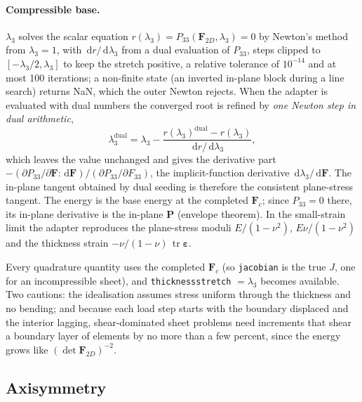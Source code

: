 \documentclass[11pt]{article}
\newcommand{\ud}{\,\mathrm{d}}
\newcommand{\tr}{\operatorname{tr}}
\newcommand{\beps}{\bm{\varepsilon}}
\newcommand{\bP}{\bm{P}}
\newcommand{\bF}{\bm{F}}
\DeclareRobustCommand{\code}[1]{{\def\_{\textunderscore\allowbreak}\texttt{#1}}}
\begin{document}
\paragraph{Compressible base.}
$\lambda_3$ solves the scalar equation $r(\lambda_3) = P_{33}(\bF_{2D}, \lambda_3) = 0$
by Newton's method from $\lambda_3 = 1$, with $\ud r/\ud\lambda_3$ from a
dual evaluation of $P_{33}$, steps clipped to $[-\lambda_3/2, \lambda_3]$
to keep the stretch positive, a relative tolerance of $10^{-14}$ and at
most 100 iterations; a non-finite state (an inverted in-plane block during
a line search) returns NaN, which the outer Newton rejects.  When the
adapter is evaluated with dual numbers the converged root is refined by
\emph{one Newton step in dual arithmetic},
\begin{equation}
  \lambda_3^{\mathrm{dual}} = \lambda_3 - \frac{r(\lambda_3)^{\mathrm{dual}} - r(\lambda_3)}{\ud r/\ud\lambda_3},
\end{equation}
which leaves the value unchanged and gives the derivative part
$-(\partial P_{33}/\partial\bF:\ud\bF)/(\partial P_{33}/\partial F_{33})$,
the implicit-function derivative $\ud\lambda_3/\ud\bF$.  The in-plane
tangent obtained by dual seeding is therefore the consistent plane-stress
tangent.  The energy is the base energy at the completed $\bF_c$; since
$P_{33} = 0$ there, its in-plane derivative is the in-plane $\bP$
(envelope theorem).  In the small-strain limit the adapter reproduces the
plane-stress moduli $E/(1-\nu^2)$, $E\nu/(1-\nu^2)$ and the thickness
strain $-\nu/(1-\nu)\,\tr\beps$.

Every quadrature quantity uses the completed $\bF_c$ (so \code{jacobian}
is the true $J$, one for an incompressible sheet), and
\code{thickness\_stretch} $= \lambda_3$ becomes available.  Two cautions:
the idealisation assumes stress uniform through the thickness and no
bending; and because each load step starts with the boundary displaced and
the interior lagging, shear-dominated sheet problems need increments that
shear a boundary layer of elements by no more than a few percent, since the
energy grows like $(\det\bF_{2D})^{-2}$.

\subsection{Axisymmetry}
\label{sec:axisymmetric}
\end{document}

